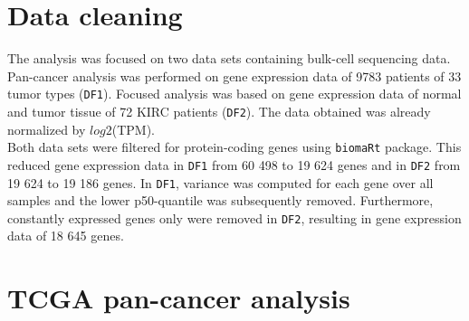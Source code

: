 \documentclass[
  parskip,
  openany]{scrreprt}
\begin{document}
\hypertarget{data-cleaning}{%
\section{Data cleaning}\label{data-cleaning}}

The analysis was focused on two data sets containing bulk-cell
sequencing data. Pan-cancer analysis was performed on gene expression
data of 9783 patients of 33 tumor types (\texttt{DF1}). Focused analysis
was based on gene expression data of normal and tumor tissue of 72 KIRC
patients (\texttt{DF2}). The data obtained was already normalized by
\(log2\)(TPM).\\
Both data sets were filtered for protein-coding genes using
\texttt{biomaRt} package. This reduced gene expression data in
\texttt{DF1} from 60 498 to 19 624 genes and in \texttt{DF2} from 19 624
to 19 186 genes. In \texttt{DF1}, variance was computed for each gene
over all samples and the lower p50-quantile was subsequently removed.
Furthermore, constantly expressed genes only were removed in
\texttt{DF2}, resulting in gene expression data of 18 645 genes.

\hypertarget{tcga-pan-cancer-analysis}{%
\section{TCGA pan-cancer analysis}\label{tcga-pan-cancer-analysis}}
\end{document}
